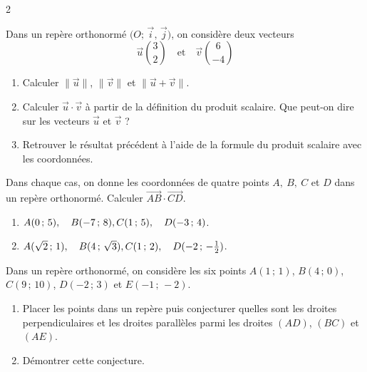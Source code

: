 \documentclass[a4paper,12pt]{article}
\begin{document}
\begin{multicols}{2}
  \begin{exercice}[title=Exercice 5 $\star$ { [Calculer] }]{}{}
    Dans un repère orthonormé \(\bigl(O;\,\vec{i},\,\vec{j}\bigr)\), on considère deux vecteurs
    \[
      \vec{u}\binom{3}{2}
      \quad\text{et}\quad
      \vec{v}\binom{6}{-4}
    \]
    \begin{enumerate}
      \item Calculer \(\|\vec{u}\|\), \(\|\vec{v}\|\) et \(\|\vec{u} + \vec{v}\|\).
      \item Calculer \(\vec{u}\cdot\vec{v}\) à partir de la définition du produit scalaire. Que peut-on dire sur les vecteurs \(\vec{u}\) et \(\vec{v}\) ?
      \item Retrouver le résultat précédent à l'aide de la formule du produit scalaire avec les coordonnées.
    \end{enumerate}
  \end{exercice}

\begin{exercice}[title=Exercice 6 $\star$ { [Calculer] }]{}{}
    Dans chaque cas, on donne les coordonnées de quatre points \(A,\ B,\ C\) et \(D\) dans un repère orthonormé. Calculer \(\overrightarrow{AB} \cdot \overrightarrow{CD}\).
    \begin{enumerate}
      \item
        \(A(0\,;\,5),\quad B(-7\,;\,8),\\ C(1\,;\,5),\quad D(-3\,;\,4)\).
      \item
        \(A(\sqrt{2}\,;\,1),\quad B(4\,;\,\sqrt{3}),\\ C(1\,;\,2),\quad D(-2\,;\,-\tfrac{1}{2})\).
    \end{enumerate}
  \end{exercice}

  \begin{exercice}[title=Exercice 7 $\star\star$ { [Chercher, Calculer] }]{}{}
    Dans un repère orthonormé, on considère les six points
    $A(1\,;\,1)$, $B(4\,;\,0)$, $C(9\,;\,10)$, $D(-2\,;\,3)$ et $E(-1\,;\,-2)$.
    \begin{enumerate}
      \item Placer les points dans un repère puis conjecturer quelles sont les droites perpendiculaires et les droites parallèles parmi les droites \((AD)\), \((BC)\) et \((AE)\).
      \item Démontrer cette conjecture.
    \end{enumerate}
  \end{exercice}


\end{multicols}
\end{document}
